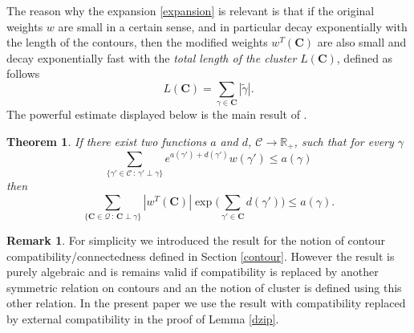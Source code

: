 \documentclass[10pt]{amsart}
\let\mathcal\mathscr
\newcommand{\sep}{\,:\,}
\numberwithin{equation}{section}
\theoremstyle{plain}
\newtheorem{theorema}{Theorem}
\theoremstyle{definition}
\newtheorem{rem}[theorem]{Remark}
\newcommand{\cQ}{{\ensuremath{\mathcal Q}} }
\newcommand{\cC}{{\ensuremath{\mathcal C}} }
\newcommand{\bC}{{\ensuremath{\mathbf C}} }
\newcommand{\bbR}{{\ensuremath{\mathbb R}} }
\begin{document}
The reason why the expansion \eqref{expansion} is relevant is that if the original weights $w$ are small in a certain sense, and in particular decay exponentially with the
length of the contours, then the modified weights $w^T(\bC)$ are also small and decay exponentially fast with the \textit{total length of the cluster} $L(\bC)$,
defined as follows
\begin{equation*}
L(\bC)=\sum_{\gamma\in \bC} |\tilde \gamma|.
\end{equation*}
The powerful estimate displayed below is the main result of \cite{cf:KP}.

\begin{theorema}\label{superclust}
If there exist two functions $a$ and $d$, $\cC\to \bbR_+$, such that for every $\gamma$%
\begin{equation}\label{condit}
\sum_{\{\gamma'\in \cC \sep \gamma' \perp \gamma\}} e^{a(\gamma')+d(\gamma')}w(\gamma')\le a(\gamma)
\end{equation}
then
\begin{equation}\label{dabound}
\sum_{\{ \bC\in \cQ \sep \bC \perp \gamma \}} |w^T(\bC)|\exp\biggl(\sum_{\gamma'\in\bC}d(\gamma')\biggr) \le a(\gamma).
\end{equation}
\end{theorema}

\begin{rem}\label{laremarc}
For simplicity we introduced the result for the notion of contour compatibility/connectedness defined in Section \ref{contour}.
However the result is purely algebraic and is remains valid if compatibility is replaced by another symmetric relation on contours and
an the notion of cluster is defined using this other relation.
In the present paper we use the result with compatibility replaced by external compatibility in the proof of Lemma \ref{dzip}.
\end{rem}
\end{document}
